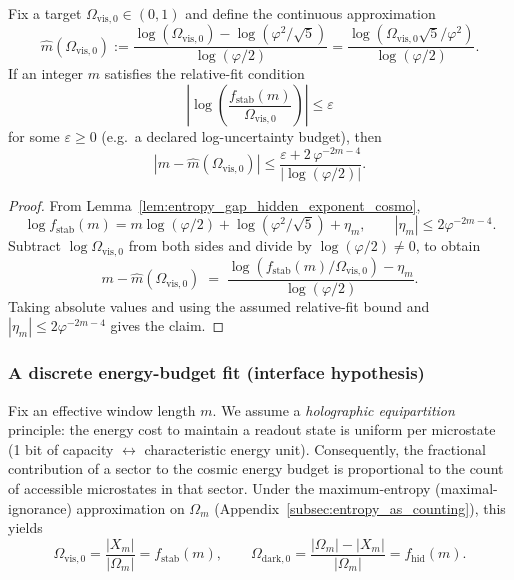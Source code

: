 \begin{proposition}\label{prop:cosmo_mstar_closed_form}
\MathTag Fix a target $\Omega_{\mathrm{vis},0}\in(0,1)$ and define the continuous approximation
\[
\widehat m(\Omega_{\mathrm{vis},0})
:=\frac{\log(\Omega_{\mathrm{vis},0})-\log(\varphi^2/\sqrt{5})}{\log(\varphi/2)}
=\frac{\log(\Omega_{\mathrm{vis},0}\sqrt{5}/\varphi^2)}{\log(\varphi/2)}.
\]
If an integer $m$ satisfies the relative-fit condition
\[
\left|\log\!\left(\frac{f_{\mathrm{stab}}(m)}{\Omega_{\mathrm{vis},0}}\right)\right|\le \varepsilon
\]
for some $\varepsilon\ge 0$ (e.g.\ a declared log-uncertainty budget), then
\[
\left|m-\widehat m(\Omega_{\mathrm{vis},0})\right|
\le \frac{\varepsilon+2\,\varphi^{-2m-4}}{|\log(\varphi/2)|}.
\]
\end{proposition}
\begin{proof}
From Lemma~\ref{lem:entropy_gap_hidden_exponent_cosmo},
\[
\log f_{\mathrm{stab}}(m)=m\log(\varphi/2)+\log(\varphi^2/\sqrt{5})+\eta_m,\qquad |\eta_m|\le 2\varphi^{-2m-4}.
\]
Subtract $\log\Omega_{\mathrm{vis},0}$ from both sides and divide by $\log(\varphi/2)\neq 0$, to obtain
\[
m-\widehat m(\Omega_{\mathrm{vis},0})
\;=\;\frac{\log(f_{\mathrm{stab}}(m)/\Omega_{\mathrm{vis},0})-\eta_m}{\log(\varphi/2)}.
\]
Taking absolute values and using the assumed relative-fit bound and $|\eta_m|\le 2\varphi^{-2m-4}$ gives the claim.
\end{proof}

\subsubsection{A discrete energy-budget fit (interface hypothesis)}
\label{subsec:cosmo_energy_budget_fit}

\begin{assumption}
\label{ass:occupancy_energy_z128}
Fix an effective window length $m$.
We assume a \emph{holographic equipartition} principle: the energy cost to maintain a readout state is uniform per microstate (1 bit of capacity $\leftrightarrow$ characteristic energy unit).
Consequently, the fractional contribution of a sector to the cosmic energy budget is proportional to the count of accessible microstates in that sector.
Under the maximum-entropy (maximal-ignorance) approximation on $\Omega_m$ (Appendix~\ref{subsec:entropy_as_counting}), this yields
\[
\Omega_{\mathrm{vis},0} = \frac{|X_m|}{|\Omega_m|} = f_{\mathrm{stab}}(m),
\qquad
\Omega_{\mathrm{dark},0} = \frac{|\Omega_m|-|X_m|}{|\Omega_m|} = f_{\mathrm{hid}}(m).
\]
\end{assumption}

